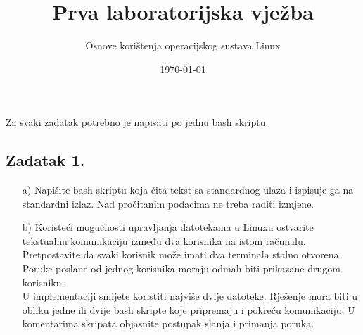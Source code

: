 \documentclass{exam}
\title{Prva laboratorijska vježba}
\author{Osnove korištenja operacijskog sustava Linux}
\date{\today}
\begin{document}
\maketitle
Za svaki zadatak potrebno je napisati po jednu bash skriptu.
\subsection*{Zadatak 1.}
\begin{itemize}
\item[a)] Napišite bash skriptu koja čita tekst sa
  standardnog ulaza i ispisuje ga na standardni izlaz.
  Nad pročitanim podacima ne treba raditi izmjene.
\item[b)] Koristeći mogućnosti upravljanja
  datotekama u Linuxu ostvarite tekstualnu komunikaciju između dva korisnika na
istom računalu. Pretpostavite da svaki korisnik može imati dva terminala stalno
otvorena. Poruke poslane od jednog korisnika moraju odmah biti prikazane drugom
korisniku.\\ U implementaciji smijete koristiti najviše dvije datoteke. Rješenje
mora biti u obliku jedne ili dvije bash skripte koje pripremaju i pokreću
komunikaciju. U komentarima skripata objasnite postupak slanja i primanja
poruka.
\end{itemize}
\end{document}
